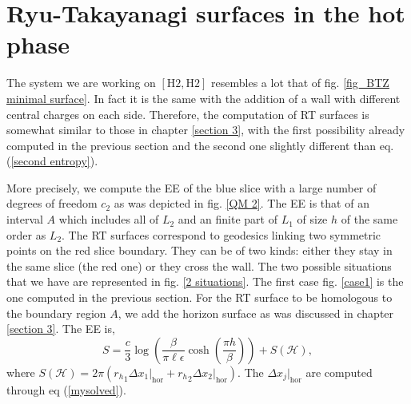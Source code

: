 \section{Ryu-Takayanagi surfaces in the hot phase}

The system we are working on $[\text{H}2,\text{H}2]$ resembles a lot that of fig. \ref{fig_BTZ minimal surface}. In fact it is the same with the addition of a wall with different central charges on each side. Therefore, the computation of RT surfaces is somewhat similar to those in chapter \ref{section 3}, with the first possibility already computed in the previous section and the second one slightly different than eq. (\ref{second entropy}). 

More precisely, we compute the EE of the blue slice with a large number of degrees of freedom $c_2$ as was depicted in fig. \ref{QM 2}. The EE is that of an interval $A$ which includes all of $L_2$ and an finite part of $L_1$ of size $h$ of the same order as $L_2$. The RT surfaces correspond to geodesics linking two symmetric points on the red slice boundary. They can be of two kinds: either they stay in the same slice (the red one) or they cross the wall. The two possible situations that we have are represented in fig. \ref{2 situations}. The first case fig. \ref{case1} is the one computed in the previous section. For the RT surface to be homologous to the boundary region $A$, we add the horizon surface as was discussed in chapter \ref{section 3}. The EE is,
\begin{equation}
    S = \frac{c}{3}\log\left(\frac{\beta}{\pi\ell\epsilon}\cosh\left(\frac{\pi h }{\beta}\right)\right) + S\left(\mathcal{H}\right),
\end{equation}
where $S\left(\mathcal{H}\right) = 2\pi \left({r_h}_1\Delta x_1\big|_\text{hor}+{r_h}_2\Delta x_2\big|_\text{hor}\right)$. The $\Delta x_j\big|_\text{hor}$ are computed through eq (\ref{mysolved}).

